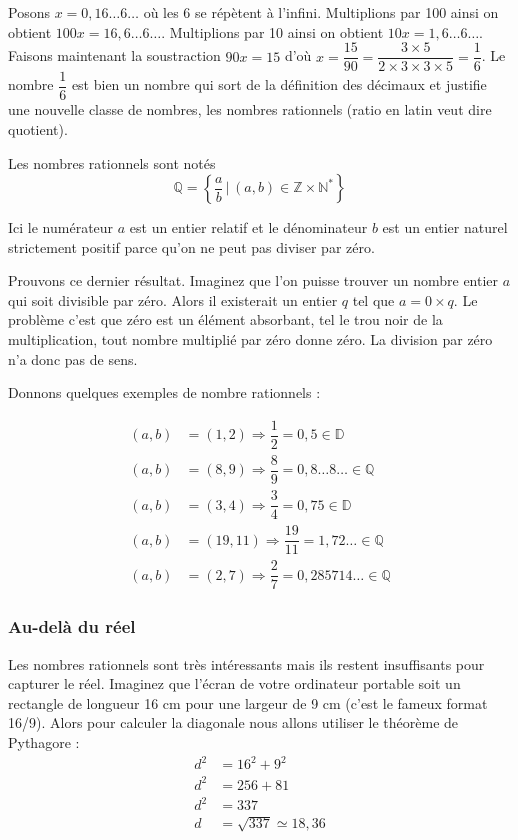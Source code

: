 \documentclass[a4paper, 11pt, twoside]{article}
\newcommand{\E}[1]{\mathbb{#1}}
\begin{document}
Posons \(x = 0,16\dots 6\dots\) où les 6 se répètent à
l'infini. Multiplions par 100 ainsi on obtient \(100x = 16,6\dots
   6\dots\). Multiplions par 10 ainsi on obtient \(10x = 1,6\dots
   6\dots\). Faisons maintenant la soustraction \(90x = 15\) d'où \(x =
   \dfrac{15}{90} = \dfrac{3\times 5}{2\times 3\times 3\times 5} =
   \dfrac{1}{6}\). Le nombre \(\dfrac{1}{6}\) est bien un nombre qui sort
de la définition des décimaux et justifie une nouvelle classe de
nombres, les nombres rationnels (ratio en latin veut dire
quotient).

Les nombres rationnels sont notés \[\E{Q} =
   \left\{\dfrac{a}{b}\,|\,(a,
   b)\in\E{Z}\times\E{N}^*\right\}\]

Ici le numérateur \(a\) est un entier relatif et le dénominateur \(b\)
est un entier naturel strictement positif parce qu'on ne peut pas
diviser par zéro.

Prouvons ce dernier résultat. Imaginez que l'on puisse trouver un
nombre entier \(a\) qui soit divisible par zéro. Alors il existerait
un entier \(q\) tel que \(a = 0\times q\). Le problème c'est que zéro
est un élément absorbant, tel le trou noir de la multiplication,
tout nombre multiplié par zéro donne zéro. La division par zéro n'a
donc pas de sens.

Donnons quelques exemples de nombre rationnels :

\begin{align*}
(a, b) &= (1, 2)\Rightarrow \dfrac{1}{2} = 0,5\in\E{D}\\
(a, b) &= (8, 9)\Rightarrow \dfrac{8}{9} = 0,8\dots 8\dots\in\E{Q}\\
(a, b) &= (3, 4)\Rightarrow \dfrac{3}{4} = 0,75\in\E{D}\\
(a, b) &= (19, 11)\Rightarrow \dfrac{19}{11} = 1,72\dots \in\E{Q}\\
(a, b) &= (2, 7)\Rightarrow \dfrac{2}{7} = 0,285714\dots \in\E{Q}
\end{align*}

\subsubsection{Au-delà du réel}
\label{sec:orgc2bee8f}

Les nombres rationnels sont très intéressants mais ils restent
insuffisants pour capturer le réel. Imaginez que l'écran de votre
ordinateur portable soit un rectangle de longueur 16 cm pour une
largeur de 9 cm (c'est le fameux format 16/9). Alors pour calculer
la diagonale nous allons utiliser le théorème de Pythagore :
\begin{align*}
d^2 &= 16^2 + 9^2\\
d^2 &= 256 + 81\\
d^2 &= 337\\
d &= \sqrt{337} \simeq 18,36
\end{align*}
\end{document}
